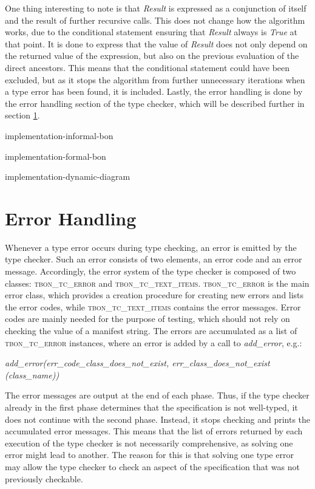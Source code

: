 One thing interesting to note is that \textit{Result} is expressed as a conjunction of itself and the result of further recursive calls. This does not change how the algorithm works, due to the conditional statement ensuring that \textit{Result} always is \textit{True} at that point. It is done to express that the value of \textit{Result} does not only depend on the returned value of the expression, but also on the previous evaluation of the direct ancestors. This means that the conditional statement could have been excluded, but as it stops the algorithm from further unnecessary iterations when a type error has been found, it is included.
Lastly, the error handling is done by the error handling section of the type checker, which will be described further in section \ref{implementation-error-handling}.

{implementation-informal-bon}

{implementation-formal-bon}

{implementation-dynamic-diagram}

\section{Error Handling}
\label{implementation-error-handling}
Whenever a type error occurs during type checking, an error is emitted by the type checker. Such an error consists of two elements, an error code and an error message. Accordingly, the error system of the type checker is composed of two classes: \textsc{tbon\_tc\_error} and \textsc{tbon\_tc\_text\_items}. \textsc{tbon\_tc\_error} is the main error class, which provides a creation procedure for creating new errors and lists the error codes, while \textsc{tbon\_tc\_text\_items} contains the error messages. Error codes are mainly needed for the purpose of testing, which should not rely on checking the value of a manifest string. The errors are accumulated as a list of  \textsc{tbon\_tc\_error} instances, where an error is added by a call to \textit{add\_error}, e.g.: 
{\footnotesize
\begin{center}
\textit{add\_error(err\_code\_class\_does\_not\_exist, err\_class\_does\_not\_exist (class\_name))}
\end{center}}
The error messages are output at the end of each phase. Thus, if the type checker already in the first phase determines that the specification is not well-typed, it does not continue with the second phase. Instead, it stops checking and prints the accumulated error messages. This means that the list of errors returned by each execution of the type checker is not necessarily comprehensive, as solving one error might lead to another. The reason for this is that solving one type error may allow the type checker to check an aspect of the specification that was not previously checkable.
